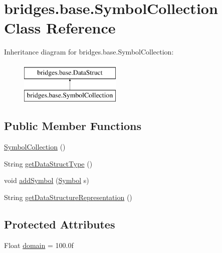 \hypertarget{classbridges_1_1base_1_1_symbol_collection}{}\section{bridges.\+base.\+Symbol\+Collection Class Reference}
\label{classbridges_1_1base_1_1_symbol_collection}
Inheritance diagram for bridges.\+base.\+Symbol\+Collection\+:\begin{figure}[H]
\begin{center}
\leavevmode
\includegraphics[height=2.000000cm]{classbridges_1_1base_1_1_symbol_collection}
\end{center}
\end{figure}
\subsection*{Public Member Functions}
\begin{DoxyCompactItemize}
\item 
\mbox{\hyperlink{classbridges_1_1base_1_1_symbol_collection_a8959dab963ce54f56560c6c27a3a3de5}{Symbol\+Collection}} ()
\item 
String \mbox{\hyperlink{classbridges_1_1base_1_1_symbol_collection_afbc928d2e6818edec96d10f52feebacb}{get\+Data\+Struct\+Type}} ()
\item 
void \mbox{\hyperlink{classbridges_1_1base_1_1_symbol_collection_a8e934c53b78b05a7e982f3ff2362adea}{add\+Symbol}} (\mbox{\hyperlink{classbridges_1_1base_1_1_symbol}{Symbol}} s)
\item 
String \mbox{\hyperlink{classbridges_1_1base_1_1_symbol_collection_a706ad8a7bcf12c194403ac3281c73674}{get\+Data\+Structure\+Representation}} ()
\end{DoxyCompactItemize}
\subsection*{Protected Attributes}
\begin{DoxyCompactItemize}
\item 
Float \mbox{\hyperlink{classbridges_1_1base_1_1_symbol_collection_a7624e96d2a4b5b6264791eb8dacbd350}{domain}} = 100.\+0f
\end{DoxyCompactItemize}


